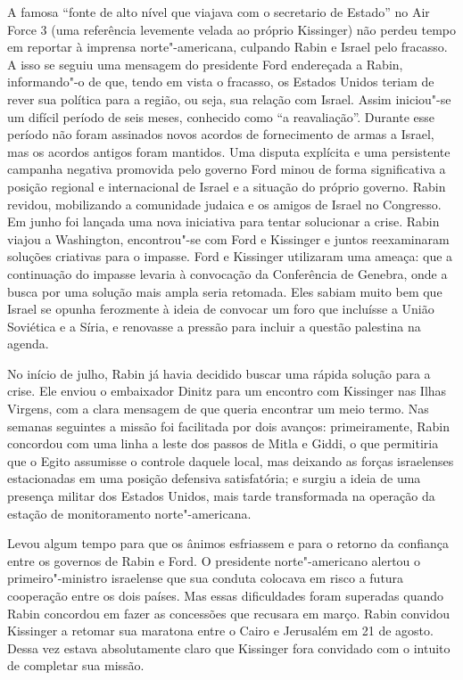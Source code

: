 A famosa ``fonte de alto nível que viajava com o secretario de Estado'' no Air Force 3 
(uma referência levemente velada ao próprio Kissinger)
não perdeu tempo em reportar à imprensa norte"-americana, culpando Rabin
e Israel pelo fracasso. A isso se seguiu uma mensagem do presidente Ford
endereçada a Rabin, informando"-o de que, tendo em vista o fracasso, os
Estados Unidos teriam de rever sua política para a região, ou seja, sua
relação com Israel. Assim iniciou"-se um difícil período de seis meses,
conhecido como ``a reavaliação''. Durante esse período não foram
assinados novos acordos de fornecimento de armas a Israel, mas os
acordos antigos foram mantidos. Uma disputa explícita e uma persistente
campanha negativa promovida pelo governo Ford minou de forma
significativa a posição regional e internacional de Israel e a situação
do próprio governo. Rabin revidou, mobilizando a comunidade judaica e os
amigos de Israel no Congresso. Em junho foi lançada uma nova iniciativa
para tentar solucionar a crise. Rabin viajou a Washington, encontrou"-se
com Ford e Kissinger e juntos reexaminaram soluções criativas para o
impasse. Ford e Kissinger utilizaram uma ameaça: que a continuação do
impasse levaria à convocação da Conferência de Genebra, onde a busca por
uma solução mais ampla seria retomada. Eles sabiam muito bem que Israel
se opunha ferozmente à ideia de convocar um foro que incluísse a União
Soviética e a Síria, e renovasse a pressão para incluir a questão
palestina na agenda.

No início de julho, Rabin já havia decidido buscar uma rápida solução
para a crise. Ele enviou o embaixador Dinitz para um encontro com
Kissinger nas Ilhas Virgens, com a clara mensagem de que queria
encontrar um meio termo. Nas semanas seguintes a missão foi facilitada
por dois avanços: primeiramente, Rabin concordou com uma linha a leste
dos passos de Mitla e Giddi, o que permitiria que o Egito assumisse o
controle daquele local, mas deixando as forças israelenses estacionadas em
uma posição defensiva satisfatória; e surgiu a ideia de uma presença
militar dos Estados Unidos, mais tarde transformada na operação da estação
de monitoramento norte"-americana.

Levou algum tempo para que os ânimos esfriassem e para o retorno da
confiança entre os governos de Rabin e Ford. O presidente
norte"-americano alertou o primeiro"-ministro israelense que sua conduta
colocava em risco a futura cooperação entre os dois países. Mas essas
dificuldades foram superadas quando Rabin concordou em fazer as
concessões que recusara em março. Rabin convidou Kissinger a
retomar sua maratona entre o Cairo e Jerusalém em 21 de agosto. Dessa
vez estava absolutamente claro que Kissinger fora convidado com o
intuito de completar sua missão.

